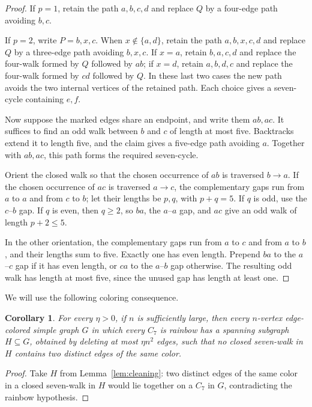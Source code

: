 \documentclass[10pt]{article}
\newtheorem{cor}[thm]{Corollary}
\theoremstyle{remark}
\begin{document}
\begin{proof}
If $p=1$, retain the path $a,b,c,d$ and replace $Q$ by a four-edge path avoiding $b,c$.

If $p=2$, write $P=b,x,c$. When $x\notin\{a,d\}$, retain the path $a,b,x,c,d$ and replace $Q$ by a three-edge path avoiding $b,x,c$. If $x=a$, retain $b,a,c,d$ and replace the four-walk formed by $Q$ followed by $ab$; if $x=d$, retain $a,b,d,c$ and replace the four-walk formed by $cd$ followed by $Q$. In these last two cases the new path avoids the two internal vertices of the retained path. Each choice gives a seven-cycle containing $e,f$.

Now suppose the marked edges share an endpoint, and write them $ab,ac$. It suffices to find an odd walk between $b$ and $c$ of length at most five. Backtracks extend it to length five, and the claim gives a five-edge path avoiding $a$. Together with $ab,ac$, this path forms the required seven-cycle.

Orient the closed walk so that the chosen occurrence of $ab$ is traversed $b\to a$. If the chosen occurrence of $ac$ is traversed $a\to c$, the complementary gaps run from $a$ to $a$ and from $c$ to $b$; let their lengths be $p,q$, with $p+q=5$. If $q$ is odd, use the $c$--$b$ gap. If $q$ is even, then $q\ge2$, so $ba$, the $a$--$a$ gap, and $ac$ give an odd walk of length $p+2\le5$.

In the other orientation, the complementary gaps run from $a$ to $c$ and from $a$ to $b$, and their lengths sum to five. Exactly one has even length. Prepend $ba$ to the $a$--$c$ gap if it has even length, or $ca$ to the $a$--$b$ gap otherwise. The resulting odd walk has length at most five, since the unused gap has length at least one.
\end{proof}

We will use the following coloring consequence.

\begin{cor}\label{cor:cleaning}
For every $\eta>0$, if $n$ is sufficiently large, then every $n$-vertex edge-colored simple graph $G$ in which every $C_7$ is rainbow has a spanning subgraph $H\subseteq G$, obtained by deleting at most $\eta n^2$ edges, such that no closed seven-walk in $H$ contains two distinct edges of the same color.
\end{cor}
\begin{proof}
Take $H$ from Lemma~\ref{lem:cleaning}: two distinct edges of the same color in a closed seven-walk in $H$ would lie together on a $C_7$ in $G$, contradicting the rainbow hypothesis.
\end{proof}
\end{document}
